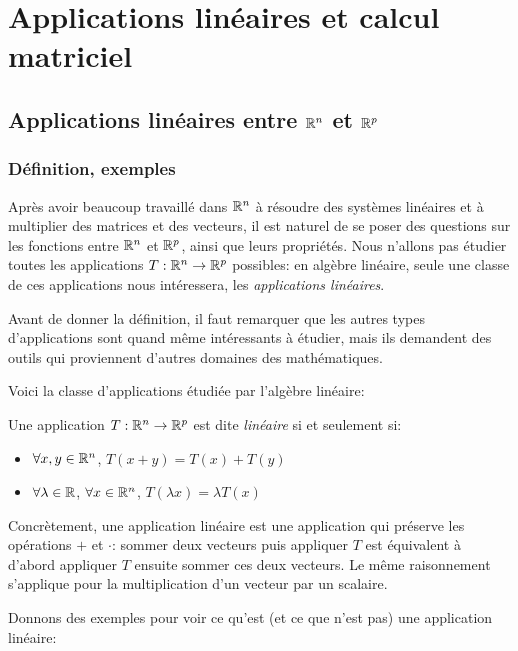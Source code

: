 \chapter{Applications linéaires et calcul matriciel}

\section{Applications linéaires entre $\mathbb{R}^n$ et $\mathbb{R}^p$}

\subsection{Définition, exemples}
Après avoir beaucoup travaillé dans $\mathbb{R}^n$ à résoudre des systèmes linéaires et à multiplier des matrices et des vecteurs, il est naturel de se poser des questions sur les fonctions entre $\mathbb{R}^n$ et $\mathbb{R}^p$, ainsi que leurs propriétés. Nous n'allons pas étudier toutes les applications $T: \mathbb{R}^n \to \mathbb{R}^p$ possibles: en algèbre linéaire, seule une classe de ces applications nous intéressera, les \textit{applications linéaires}. 

Avant de donner la définition, il faut remarquer que les autres types d'applications sont quand même intéressants à étudier, mais ils demandent des outils qui proviennent d'autres domaines des mathématiques.

Voici la classe d'applications étudiée par l'algèbre linéaire:
\begin{boxdef}
Une application $T: \mathbb{R}^n \to \mathbb{R}^p$ est dite \textit{linéaire} si et seulement si:
\begin{itemize}
    \item $\forall x,y \in \mathbb{R}^n$, $T(x+y) = T(x) + T(y)$
    \item $\forall \lambda \in \mathbb{R}$, $\forall x \in \mathbb{R}^n$, $T(\lambda x) = \lambda T(x)$
\end{itemize}
\end{boxdef}
Concrètement, une application linéaire est une application qui préserve les opérations $+$ et $\cdot$: sommer deux vecteurs puis appliquer $T$ est équivalent à d'abord appliquer $T$ ensuite sommer ces deux vecteurs. Le même raisonnement s'applique pour la multiplication d'un vecteur par un scalaire.

Donnons des exemples pour voir ce qu'est (et ce que n'est pas) une application linéaire:

